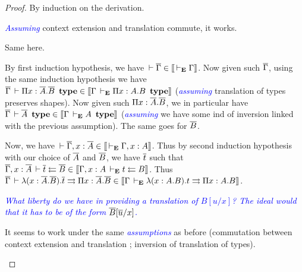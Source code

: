 \documentclass{amsart}
\newcommand\meta[1]{\noindent\textcolor{blue}{\emph{#1}}}
\begin{document}
\begin{proof}
  By induction on the derivation.
  \begin{caselist}
    \nextcase
    \begin{mathc}
    \end{mathc}
    \meta{Assuming} context extension and translation commute, it works.

    \nextcase
    \begin{mathc}
    \end{mathc}
    Same here.

    \nextcase
    \begin{mathc}
    \end{mathc}
    By first induction hypothesis, we have $\,\vdash \overline{\Gamma} \in \mathopen{{[\kern-0.14em[}} \,\vdash_\mathbf{E} \Gamma \mathclose{{]\kern-0.14em]}}$.
    Now given such $\overline{\Gamma}$, using the same induction hypothesis we have
    $\overline{\Gamma} \,\vdash \Pi x:\overline{A}.\overline{B}\ \operatorname{\mathbf{type}}
    \in \mathopen{{[\kern-0.14em[}} \Gamma \,\vdash_\mathbf{E} \Pi x:A.B\ \operatorname{\mathbf{type}} \mathclose{{]\kern-0.14em]}}$
    (\meta{assuming} translation of types preserves shapes).
    Now given such $\Pi x:\overline{A}.\overline{B}$, we in particular have
    $\barG \der \barA\ \type \in \den{\Gamma \dere A\ \type}$
    (\meta{assuming} we have some ind of inversion linked with the previous
    assumption). The same goes for $\overline{B}$.

    Now, we have $\,\vdash \overline{\Gamma}, x:\overline{A} \in \mathopen{{[\kern-0.14em[}} \,\vdash_\mathbf{E} \Gamma, x:A \mathclose{{]\kern-0.14em]}}$.
    Thus by second induction hypothesis with our choice of $\overline{A}$ and
    $\overline{B}$, we have $\overline{t}$ such that
    $\overline{\Gamma}, x:\overline{A} \,\vdash \overline{t} \leftleftarrows \overline{B} \in
    \mathopen{{[\kern-0.14em[}} \Gamma, x:A \,\vdash_\mathbf{E} t \leftleftarrows B \mathclose{{]\kern-0.14em]}}$.
    Thus $\overline{\Gamma} \,\vdash \lambda (x:\overline{A}.\overline{B}).\overline{t} \rightrightarrows \Pi x:\overline{A}.\overline{B}
    \in \mathopen{{[\kern-0.14em[}} \Gamma \,\vdash_\mathbf{E} \lambda (x:A.B).t \rightrightarrows \Pi x:A.B \mathclose{{]\kern-0.14em]}}$.

    \nextcase
    \begin{mathc}
    \end{mathc}
    \meta{What liberty do we have in providing a translation of $B[u/x]$? The
    ideal would that it has to be of the form $\overline{B}[\overline{u}/x]$.}

    \nextcase
    \begin{mathc}
    \end{mathc}
    It seems to work under the same \meta{assumptions} as before (commutation
    between context extension and translation ; inversion of translation of
    types).


\end{caselist}
\end{proof}
\end{document}
